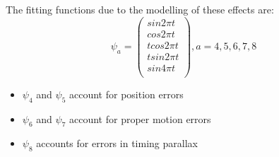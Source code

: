 \documentclass{beamer}
\begin{document}

\begin{frame}
The fitting functions due to the modelling of these effects are:
	$$
\psi_a=
\begin{pmatrix}
sin2 \pi t\\
cos2 \pi t\\
t cos2 \pi t\\
t sin2 \pi t\\
sin4 \pi t\\
\end{pmatrix}, a=4,5,6,7,8
$$

\begin{itemize}
	\item $\psi_4$ and $\psi_5$ account for position errors
	\item $\psi_6$ and $\psi_7$ account for proper motion errors
	\item $\psi_8$ accounts for errors in timing parallax
\end{itemize}
\end{frame} 
\end{document}
